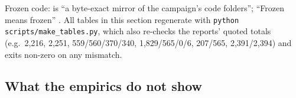 Frozen code:  is ``a byte-exact mirror of the campaign's code folders''; ``Frozen means
frozen''  . All tables
in this section regenerate with \texttt{python scripts/make\_tables.py}, which also re-checks the reports' quoted totals (e.g.\ 2,216, 2,251,
559/560/370/340, 1,829/565/0/6, 207/565, 2,391/2,394) and exits non-zero on any mismatch.

\subsection{What the empirics do not show}\label{sec:emp-limits}

